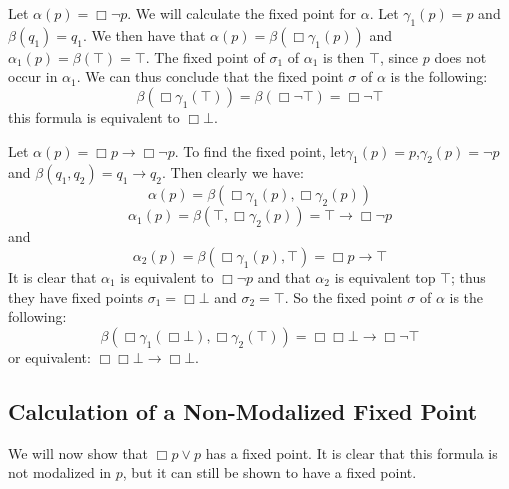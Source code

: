 \documentclass[../main.tex]{subfiles}
\begin{document}
\begin{exmp}
	Let $\alpha(p)=\Box \neg p$. We will calculate the fixed point for
	$\alpha$. Let $\gamma_1 (p)=p$ and $\beta(q_1)=q_1$. We then have that
	$\alpha(p)=\beta(\Box\gamma_1(p))$ and $\alpha_1(p)=\beta(\top)=\top$.
	The fixed point of $\sigma_1$ of $\alpha_1$ is then $\top$, since $p$
	does not occur in $\alpha_1$. We can thus conclude that the fixed point
	$\sigma$ of $\alpha$ is the following:
	\[\beta(\Box\gamma_1(\top))=\beta(\Box\neg\top)=\Box\neg\top\]
	this formula is equivalent to $\Box\bot$.
\end{exmp}
\begin{exmp}
	Let $\alpha(p)=\Box p\rightarrow\Box\neg p$. To find the fixed point,
	let$\gamma_1(p)=p$,$\gamma_2(p)=\neg p$ and
	$\beta(q_1,q_2)=q_1\rightarrow q_2$. Then clearly we have:
	\[\alpha(p)=\beta(\Box\gamma_1(p),\Box\gamma_2(p))\]
	\[\alpha_1(p)=\beta(\top,\Box\gamma_2(p))=\top\rightarrow\Box\neg p\]
	and 
	\[\alpha_2(p)=\beta(\Box\gamma_1(p),\top)=\Box p\rightarrow \top\]
	It is clear that $\alpha_1$ is equivalent to $\Box\neg p$ and that
	$\alpha_2$ is equivalent top $\top$; thus they have fixed points
	$\sigma_1=\Box\bot$ and $\sigma_2=\top$. So the fixed point $\sigma$
	of $\alpha$ is the following:
	\[\beta(\Box\gamma_1(\Box\bot),\Box\gamma_2(\top))=\Box\Box\bot\rightarrow\Box\neg\top\]
	or equivalent: $\Box\Box\bot\rightarrow\Box\bot$.
\end{exmp}
\subsection{Calculation of a Non-Modalized Fixed Point}
We will now show that $\Box p\vee p$ has a fixed point. It is
clear that this formula is not modalized in $p$, but it can still be shown to
have a fixed point.
\end{document}
